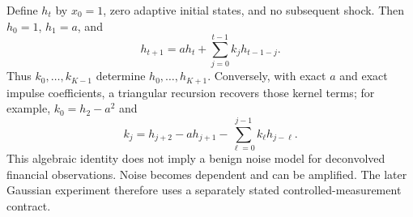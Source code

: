 \documentclass[11pt]{article}
\theoremstyle{remark}\newtheorem{remark}[theorem]{Remark}
\begin{document}
Define $h_t$ by $x_0=1$, zero adaptive initial states, and no subsequent shock. Then $h_0=1$, $h_1=a$, and
\begin{equation}
 h_{t+1}=a h_t+\sum_{j=0}^{t-1}k_jh_{t-1-j}.\label{eq:impulse}
\end{equation}
Thus $k_0,\ldots,k_{K-1}$ determine $h_0,\ldots,h_{K+1}$. Conversely, with exact $a$ and exact impulse coefficients, a triangular recursion recovers those kernel terms; for example, $k_0=h_2-a^2$ and
\begin{equation}
 k_j=h_{j+2}-a h_{j+1}-\sum_{\ell=0}^{j-1}k_\ell h_{j-\ell}.
\end{equation}
This algebraic identity does not imply a benign noise model for deconvolved financial observations. Noise becomes dependent and can be amplified. The later Gaussian experiment therefore uses a separately stated controlled-measurement contract.
\end{document}
